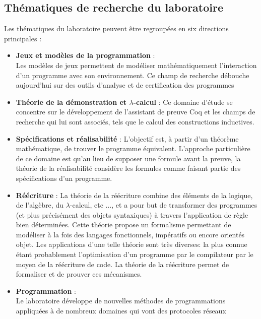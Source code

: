 \documentclass[a4paper, 11pt]{report}
\newcommand{\lc}[0]{$\lambda$-calcul\xspace}
\begin{document}
    \subsection{Thématiques de recherche du laboratoire}
      Les thématiques du laboratoire peuvent être regroupées en six directions
      principales :
      \begin{itemize}
        \item \textbf{Jeux et modèles de la programmation} : \\
          Les modèles de jeux permettent de modéliser mathématiquement
          l'interaction d'un programme avec son environnement. Ce champ de
          recherche débouche aujourd'hui sur des outils d'analyse et de
          certification des programmes
        \item \textbf{Théorie de la démonstration et \lc} :
          Ce domaine d'étude se concentre sur le développement de l'assistant
          de preuve Coq et les champs de recherche qui lui sont associés,
          tels que le calcul des constructions inductives.
        \item \textbf{Spécifications et réalisabilité} :
          L'objectif est, à partir d'un théorème mathématique, de trouver
          le programme équivalent. L'approche particulière de ce domaine est
          qu'au lieu de supposer une formule avant la preuve, la théorie de la
          réalisabilité considère les formules comme faisant partie des
          spécifications d'un programme.
        \item \textbf{Réécriture} :
          La théorie de la réécriture combine des éléments de la logique, de
          l'algèbre, du \lc, etc $\ldots$, et a pour but de transformer des
          programmes (et plus précisément des objets syntaxiques) à travers
          l'application de règle bien déterminées. Cette théorie propose
          un formalisme permettant de modéliser à la fois des langages
          fonctionnels, impératifs ou encore orientés objet.
          Les applications d'une telle théorie sont très diverses: la plus
          connue étant probablement l'optimisation d'un programme par le
          compilateur par le moyen de la réécriture de code.
          La théorie de la réécriture permet de formaliser et de prouver ces
          mécanismes.
        \item \textbf{Programmation} : \\
          Le laboratoire développe de nouvelles méthodes de programmations
          appliquées à de nombreux domaines qui vont des protocoles réseaux

\end{itemize}
\end{document}
